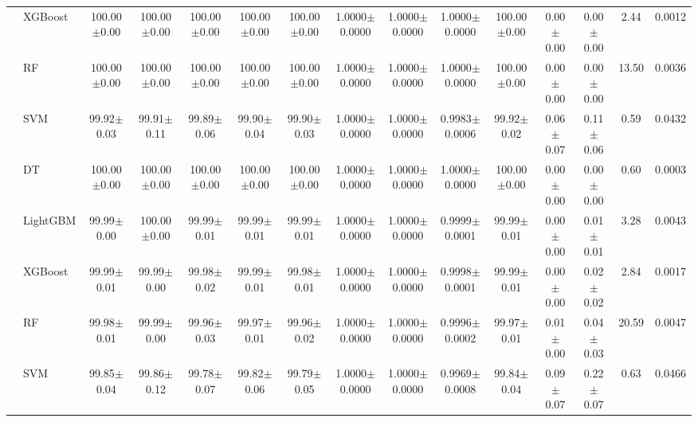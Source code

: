 \begin{tabular}{@{}llccccccccccccc@{}}
 & XGBoost & 100.00{\tiny$\pm$0.00} & 100.00{\tiny$\pm$0.00} & 100.00{\tiny$\pm$0.00} & 100.00{\tiny$\pm$0.00} & 100.00{\tiny$\pm$0.00} & 1.0000{\tiny$\pm$0.0000} & 1.0000{\tiny$\pm$0.0000} & 1.0000{\tiny$\pm$0.0000} & 100.00{\tiny$\pm$0.00} & 0.00{\tiny$\pm$0.00} & 0.00{\tiny$\pm$0.00} & 2.44 & 0.0012\\
 & RF & 100.00{\tiny$\pm$0.00} & 100.00{\tiny$\pm$0.00} & 100.00{\tiny$\pm$0.00} & 100.00{\tiny$\pm$0.00} & 100.00{\tiny$\pm$0.00} & 1.0000{\tiny$\pm$0.0000} & 1.0000{\tiny$\pm$0.0000} & 1.0000{\tiny$\pm$0.0000} & 100.00{\tiny$\pm$0.00} & 0.00{\tiny$\pm$0.00} & 0.00{\tiny$\pm$0.00} & 13.50 & 0.0036\\
 & SVM & 99.92{\tiny$\pm$0.03} & 99.91{\tiny$\pm$0.11} & 99.89{\tiny$\pm$0.06} & 99.90{\tiny$\pm$0.04} & 99.90{\tiny$\pm$0.03} & 1.0000{\tiny$\pm$0.0000} & 1.0000{\tiny$\pm$0.0000} & 0.9983{\tiny$\pm$0.0006} & 99.92{\tiny$\pm$0.02} & 0.06{\tiny$\pm$0.07} & 0.11{\tiny$\pm$0.06} & 0.59 & 0.0432\\
 & DT & 100.00{\tiny$\pm$0.00} & 100.00{\tiny$\pm$0.00} & 100.00{\tiny$\pm$0.00} & 100.00{\tiny$\pm$0.00} & 100.00{\tiny$\pm$0.00} & 1.0000{\tiny$\pm$0.0000} & 1.0000{\tiny$\pm$0.0000} & 1.0000{\tiny$\pm$0.0000} & 100.00{\tiny$\pm$0.00} & 0.00{\tiny$\pm$0.00} & 0.00{\tiny$\pm$0.00} & 0.60 & 0.0003\\
\midrule
{} & LightGBM & 99.99{\tiny$\pm$0.00} & 100.00{\tiny$\pm$0.00} & 99.99{\tiny$\pm$0.01} & 99.99{\tiny$\pm$0.01} & 99.99{\tiny$\pm$0.01} & 1.0000{\tiny$\pm$0.0000} & 1.0000{\tiny$\pm$0.0000} & 0.9999{\tiny$\pm$0.0001} & 99.99{\tiny$\pm$0.01} & 0.00{\tiny$\pm$0.00} & 0.01{\tiny$\pm$0.01} & 3.28 & 0.0043\\
 & XGBoost & 99.99{\tiny$\pm$0.01} & 99.99{\tiny$\pm$0.00} & 99.98{\tiny$\pm$0.02} & 99.99{\tiny$\pm$0.01} & 99.98{\tiny$\pm$0.01} & 1.0000{\tiny$\pm$0.0000} & 1.0000{\tiny$\pm$0.0000} & 0.9998{\tiny$\pm$0.0001} & 99.99{\tiny$\pm$0.01} & 0.00{\tiny$\pm$0.00} & 0.02{\tiny$\pm$0.02} & 2.84 & 0.0017\\
 & RF & 99.98{\tiny$\pm$0.01} & 99.99{\tiny$\pm$0.00} & 99.96{\tiny$\pm$0.03} & 99.97{\tiny$\pm$0.01} & 99.96{\tiny$\pm$0.02} & 1.0000{\tiny$\pm$0.0000} & 1.0000{\tiny$\pm$0.0000} & 0.9996{\tiny$\pm$0.0002} & 99.97{\tiny$\pm$0.01} & 0.01{\tiny$\pm$0.00} & 0.04{\tiny$\pm$0.03} & 20.59 & 0.0047\\
 & SVM & 99.85{\tiny$\pm$0.04} & 99.86{\tiny$\pm$0.12} & 99.78{\tiny$\pm$0.07} & 99.82{\tiny$\pm$0.06} & 99.79{\tiny$\pm$0.05} & 1.0000{\tiny$\pm$0.0000} & 1.0000{\tiny$\pm$0.0000} & 0.9969{\tiny$\pm$0.0008} & 99.84{\tiny$\pm$0.04} & 0.09{\tiny$\pm$0.07} & 0.22{\tiny$\pm$0.07} & 0.63 & 0.0466\\

\end{tabular}
